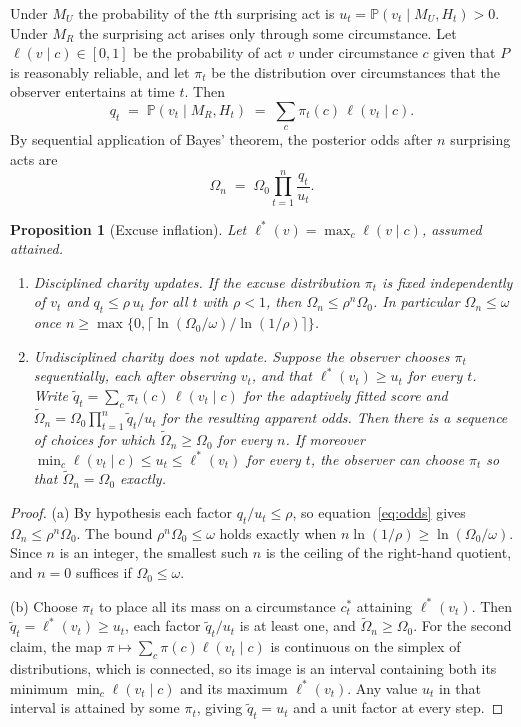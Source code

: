 \documentclass[11pt]{article}
\newtheorem{proposition}{Proposition}
\theoremstyle{definition}
\theoremstyle{remark}
\renewcommand{\Pr}{\mathbb{P}}
\begin{document}
Under $M_U$ the probability of the $t$th surprising act is $u_t=\Pr(v_t\mid M_U,H_t)>0$. Under $M_R$ the surprising act arises only through some circumstance. Let $\ell(v\mid c)\in[0,1]$ be the probability of act $v$ under circumstance $c$ given that $P$ is reasonably reliable, and let $\pi_t$ be the distribution over circumstances that the observer entertains at time $t$. Then
\[
q_t\;=\;\Pr(v_t\mid M_R,H_t)\;=\;\sum_{c}\pi_t(c)\,\ell(v_t\mid c).
\]
By sequential application of Bayes' theorem, the posterior odds after $n$ surprising acts are
\begin{equation}
\Omega_n\;=\;\Omega_0\prod_{t=1}^{n}\frac{q_t}{u_t}.
\label{eq:odds}
\end{equation}

\begin{proposition}[Excuse inflation]\label{prop:inflation}
Let $\ell^{*}(v)=\max_{c}\ell(v\mid c)$, assumed attained.
\begin{enumerate}[label=(\alph*), itemsep=0.2em]
\item \emph{Disciplined charity updates.} If the excuse distribution $\pi_t$ is fixed independently of $v_t$ and $q_t\le\rho\,u_t$ for all $t$ with $\rho<1$, then $\Omega_n\le\rho^{n}\Omega_0$. In particular $\Omega_n\le\omega$ once $n\ge\max\{0,\lceil\ln(\Omega_0/\omega)/\ln(1/\rho)\rceil\}$.
\item \emph{Undisciplined charity does not update.} Suppose the observer chooses $\pi_t$ sequentially, each after observing $v_t$, and that $\ell^{*}(v_t)\ge u_t$ for every $t$. Write $\tilde q_t=\sum_c\pi_t(c)\,\ell(v_t\mid c)$ for the adaptively fitted score and $\tilde\Omega_n=\Omega_0\prod_{t=1}^{n}\tilde q_t/u_t$ for the resulting apparent odds. Then there is a sequence of choices for which $\tilde\Omega_n\ge\Omega_0$ for every $n$. If moreover $\min_c\ell(v_t\mid c)\le u_t\le\ell^{*}(v_t)$ for every $t$, the observer can choose $\pi_t$ so that $\tilde\Omega_n=\Omega_0$ exactly.
\end{enumerate}
\end{proposition}

\begin{proof}
(a) By hypothesis each factor $q_t/u_t\le\rho$, so equation~\eqref{eq:odds} gives $\Omega_n\le\rho^n\Omega_0$. The bound $\rho^n\Omega_0\le\omega$ holds exactly when $n\ln(1/\rho)\ge\ln(\Omega_0/\omega)$. Since $n$ is an integer, the smallest such $n$ is the ceiling of the right-hand quotient, and $n=0$ suffices if $\Omega_0\le\omega$.

(b) Choose $\pi_t$ to place all its mass on a circumstance $c^{*}_t$ attaining $\ell^{*}(v_t)$. Then $\tilde q_t=\ell^{*}(v_t)\ge u_t$, each factor $\tilde q_t/u_t$ is at least one, and $\tilde\Omega_n\ge\Omega_0$. For the second claim, the map $\pi\mapsto\sum_c\pi(c)\ell(v_t\mid c)$ is continuous on the simplex of distributions, which is connected, so its image is an interval containing both its minimum $\min_c\ell(v_t\mid c)$ and its maximum $\ell^{*}(v_t)$. Any value $u_t$ in that interval is attained by some $\pi_t$, giving $\tilde q_t=u_t$ and a unit factor at every step.
\end{proof}
\end{document}

